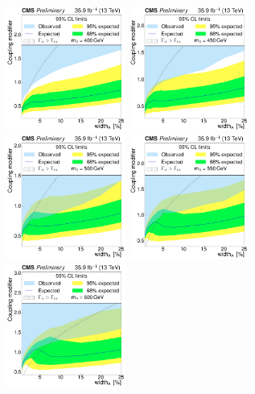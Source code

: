 \begin{figure}[!Hhtb]
\centering
\includegraphics[width=0.35\textwidth,keepaspectratio=true]{fig/chapt8/limits/limit_A_M400.pdf}
\includegraphics[width=0.35\textwidth,keepaspectratio=true]{fig/chapt8/limits/limit_A_M450.pdf}
\includegraphics[width=0.35\textwidth,keepaspectratio=true]{fig/chapt8/limits/limit_A_M500.pdf}
\includegraphics[width=0.35\textwidth,keepaspectratio=true]{fig/chapt8/limits/limit_A_M550.pdf}
\includegraphics[width=0.35\textwidth,keepaspectratio=true]{fig/chapt8/limits/limit_A_M600.pdf}

\end{figure}
